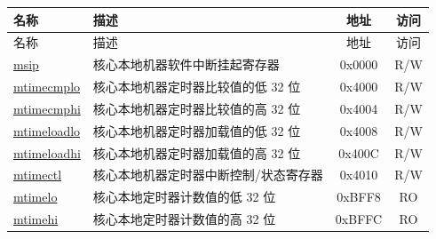 \begin{longtable}{ | p{4.0cm} | p{8.4cm} | c | c| }
\hline\rowcolor{lightgray}
名称 & 描述 & 地址 & 访问 \\ \hline
\endfirsthead
\hline
\rowcolor{lightgray}
名称 & 描述 & 地址 & 访问  \\
\hline
\endhead
\endfoot

\hyperref[regdesc:CLINTMSIPREG] {msip} & 核心本地机器软件中断挂起寄存器 & 0x0000 & R/W \\\hline
\hyperref[regdesc:CLINTMTIMECMPLOREG] {mtimecmplo} & 核心本地机器定时器比较值的低 32 位 & 0x4000 & R/W \\\hline
\hyperref[regdesc:CLINTMTIMECMPHIREG] {mtimecmphi} & 核心本地机器定时器比较值的高 32 位 & 0x4004 & R/W \\\hline
\hyperref[regdesc:CLINTMTIMELOADLOREG] {mtimeloadlo} & 核心本地机器定时器加载值的低 32 位 & 0x4008 & R/W \\\hline
\hyperref[regdesc:CLINTMTIMELOADHIREG] {mtimeloadhi} & 核心本地机器定时器加载值的高 32 位 & 0x400C & R/W \\\hline
\hyperref[regdesc:CLINTMTIMECTLREG] {mtimectl} & 核心本地机器定时器中断控制/状态寄存器 & 0x4010 & R/W \\\hline
\hyperref[regdesc:CLINTMTIMELOREG] {mtimelo} & 核心本地定时器计数值的低 32 位 & 0xBFF8 & RO \\\hline
\hyperref[regdesc:CLINTMTIMELOREG] {mtimehi} & 核心本地定时器计数值的高 32 位 & 0xBFFC & RO\\\hline
\end{longtable}